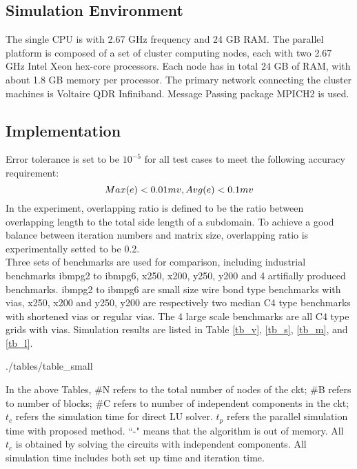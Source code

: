 \documentclass{sig-alternate}
\begin{document}
  \subsection{Simulation Environment}
	The single CPU is with 2.67 GHz frequency and 24 GB RAM. The parallel platform is composed of a set of cluster 
	computing nodes, each with two 2.67 GHz Intel Xeon hex-core processors. Each node has in total 24 GB of RAM, with about 
	1.8 GB memory per processor. The primary network connecting the cluster machines is Voltaire QDR Infiniband. Message 
	Passing package MPICH2 is used.  
  \subsection{Implementation}
	Error tolerance is set to be $10^{-5}$ for all test cases to meet the following accuracy requirement:
	\begin{equation}
		Max(e) < 0.01 mv, Avg(e) < 0.1 mv\\ \label{eq_err}
	\end{equation}
	In the experiment, overlapping ratio is defined to be the ratio between overlapping length to the total side length of 
	a subdomain. To achieve a good balance between iteration numbers and matrix size, overlapping ratio is experimentally 
	setted to be 0.2.\\
			
	Three sets of benchmarks are used for comparison, including 
	industrial benchmarks ibmpg2 to ibmpg6, x250, x200, y250, y200 and 4 artifially produced benchmarks. ibmpg2 to ibmpg6 are 
	small size wire bond type benchmarks with vias, x250, x200 and y250, y200 are respectively two median C4 type benchmarks with
	shortened vias or regular vias. The 4 large scale benchmarks are all C4 type grids with vias. Simulation results are 
	listed in Table \ref{tb_v}, \ref{tb_s}, \ref{tb_m}, and \ref{tb_l}.\\

	\begin{table}[h]
	   \label{tb_v}
  	   {./tables/table_small} \label{tb_s}
  	   \label{tb_m}
  	   \label{tb_l}
	\end{table}
	
	In the above Tables, \#N refers to the total number of nodes of the ckt; \#B refers to number of blocks; \#C refers to number 
	of independent components in the 
	ckt; $t_c$ refers the simulation time for direct LU solver. $t_p$ refers the parallel simulation time with proposed method. ``-"
	means that the algorithm is out of memory. All $t_c$ is obtained by solving the circuits with independent components. All 
	simulation time includes both set up time and iteration time.\\
\end{document}
